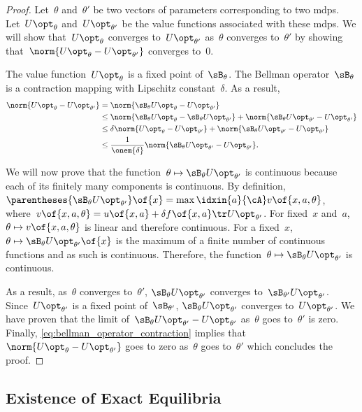 \begin{proof}
Let~\(\theta\) and~\(\theta'\) be two vectors of parameters corresponding to two \acp{mdp}.
Let~\(\Utheta\) and~\(\Uthetap\) be the value functions associated with these \acp{mdp}.
We will show that~\(\Utheta\) converges to~\(\Uthetap\) as~\(\theta\) converges to~\(\theta'\) by showing that~\(\norm{\Utheta - \Uthetap}\) converges to~\(0\).

The value function~\(\Utheta\) is a fixed point of~\(\Btheta\). The Bellman operator~\(\Btheta\) is a contraction mapping with Lipschitz constant~\(\delta\). As a result,
\begin{equation}
\label{eq:bellman_operator_contraction}
\begin{aligned}
\norm{\Utheta - \Uthetap} &= \norm{\Btheta \Utheta - \Uthetap} \\
&\le \norm{\Btheta \Utheta - \Btheta \Uthetap} + \norm{\Btheta\Uthetap - \Uthetap} \\
&\le \delta \norm{\Utheta - \Uthetap} + \norm{\Btheta\Uthetap - \Uthetap} \\
&\le \frac{1}{\onem{\delta}} \norm{\Btheta\Uthetap - \Uthetap}.
\end{aligned}
\end{equation}

We will now prove that the function~\(\theta \mapsto \Btheta \Uthetap\) is continuous because each of its finitely many components is continuous.
By definition, \(\parentheses{\Btheta \Uthetap} \of{x} = \max\idxin{a}{\cA} v \of{x, a, \theta}\), where~\(v \of{x, a, \theta} = u \of{x, a} + \delta f \of{x, a}\tr \Uthetap\).
For fixed~\(x\) and~\(a\), \(\theta \mapsto v \of{x, a, \theta}\) is linear and therefore continuous.
For a fixed~\(x\), \(\theta \mapsto \Btheta \Uthetap \of{x}\) is the maximum of a finite number of continuous functions and as such is continuous.
Therefore, the function~\(\theta \mapsto \Btheta \Uthetap\) is continuous.

As a result, as~\(\theta\) converges to~\(\theta'\), \(\Btheta \Uthetap\) converges to~\(\Bthetap \Uthetap\).
Since~\(\Uthetap\) is a fixed point of~\(\Bthetap\), \(\Btheta \Uthetap\) converges to~\(\Uthetap\).
We have proven that the limit of~\({\Btheta\Uthetap - \Uthetap}\) as~\(\theta\) goes to~\(\theta'\) is zero.
Finally, \cref{eq:bellman_operator_contraction} implies that~\(\norm{\Utheta - \Uthetap}\) goes to zero as~\(\theta\) goes to~\(\theta'\) which concludes the proof.
\end{proof}

\subsection{Existence of Exact Equilibria}

